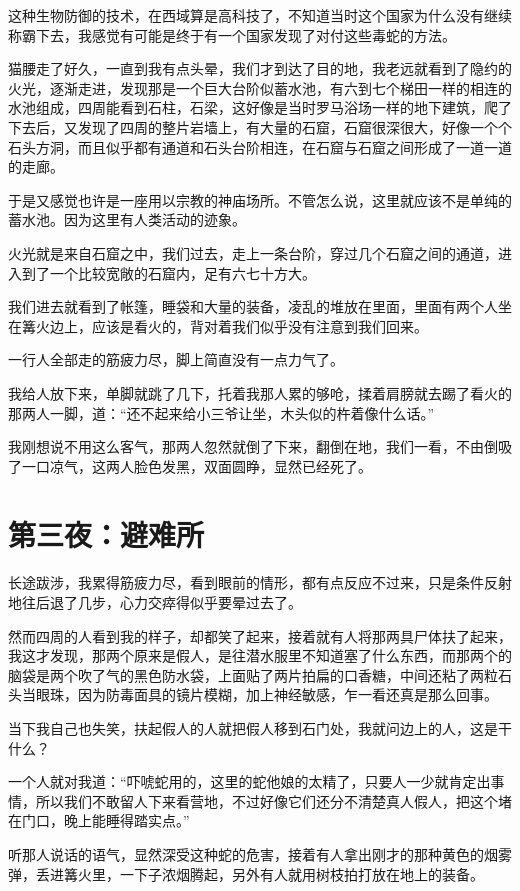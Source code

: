 这种生物防御的技术，在西域算是高科技了，不知道当时这个国家为什么没有继续称霸下去，我感觉有可能是终于有一个国家发现了对付这些毒蛇的方法。

猫腰走了好久，一直到我有点头晕，我们才到达了目的地，我老远就看到了隐约的火光，逐渐走进，发现那是一个巨大台阶似蓄水池，有六到七个梯田一样的相连的水池组成，四周能看到石柱，石梁，这好像是当时罗马浴场一样的地下建筑，爬了下去后，又发现了四周的整片岩墙上，有大量的石窟，石窟很深很大，好像一个个石头方洞，而且似乎都有通道和石头台阶相连，在石窟与石窟之间形成了一道一道的走廊。

于是又感觉也许是一座用以宗教的神庙场所。不管怎么说，这里就应该不是单纯的蓄水池。因为这里有人类活动的迹象。

火光就是来自石窟之中，我们过去，走上一条台阶，穿过几个石窟之间的通道，进入到了一个比较宽敞的石窟内，足有六七十方大。

我们进去就看到了帐篷，睡袋和大量的装备，凌乱的堆放在里面，里面有两个人坐在篝火边上，应该是看火的，背对着我们似乎没有注意到我们回来。

一行人全部走的筋疲力尽，脚上简直没有一点力气了。

我给人放下来，单脚就跳了几下，托着我那人累的够呛，揉着肩膀就去踢了看火的那两人一脚，道：“还不起来给小三爷让坐，木头似的杵着像什么话。”

我刚想说不用这么客气，那两人忽然就倒了下来，翻倒在地，我们一看，不由倒吸了一口凉气，这两人脸色发黑，双面圆睁，显然已经死了。

\chapter{第三夜：避难所}

长途跋涉，我累得筋疲力尽，看到眼前的情形，都有点反应不过来，只是条件反射地往后退了几步，心力交瘁得似乎要晕过去了。

然而四周的人看到我的样子，却都笑了起来，接着就有人将那两具尸体扶了起来，我这才发现，那两个原来是假人，是往潜水服里不知道塞了什么东西，而那两个的脑袋是两个吹了气的黑色防水袋，上面贴了两片拍扁的口香糖，中间还粘了两粒石头当眼珠，因为防毒面具的镜片模糊，加上神经敏感，乍一看还真是那么回事。

当下我自己也失笑，扶起假人的人就把假人移到石门处，我就问边上的人，这是干什么？

一个人就对我道：“吓唬蛇用的，这里的蛇他娘的太精了，只要人一少就肯定出事情，所以我们不敢留人下来看营地，不过好像它们还分不清楚真人假人，把这个堵在门口，晚上能睡得踏实点。”

听那人说话的语气，显然深受这种蛇的危害，接着有人拿出刚才的那种黄色的烟雾弹，丢进篝火里，一下子浓烟腾起，另外有人就用树枝拍打放在地上的装备。

